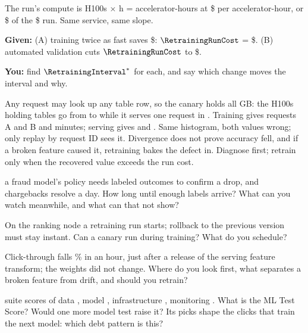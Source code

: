 \documentclass{studysheet}
\begin{document}
\begin{leftcol}
\vspace{12pt}
\begin{practicebox}
The run's compute is  H100s $\times$  h =  accelerator-hours at
\$ per accelerator-hour, or \$ of the \$ run. Same service, same slope.\par\vspace{4pt}
\textbf{Given:} (A) training twice as fast saves \$: $\RetrainingRunCost$ = \$.
(B) \assumed{} automated validation cuts $\RetrainingRunCost$ to \$.\par
\textbf{You:} find $\RetrainingInterval^*$ for each, and say which change moves the interval and why.
\end{practicebox}
\end{leftcol}%
\begin{rightcol}
%
  {Any request may look up any table row, so the canary holds all  GB: the H100s holding
   tables go from  to  while it serves one request in .}{}
%
  {Training gives requests A and B  and  minutes; serving gives
    and . Same histogram, both values wrong; only replay by request ID sees it.}{}
%
  {Divergence does not prove accuracy fell, and if a broken feature caused it, retraining bakes the defect
   in. Diagnose first; retrain only when the recovered value exceeds the run cost.}{}

\vspace{2pt}
\begin{qs}
\item \assumed{} a fraud model's policy needs  labeled outcomes to confirm a drop, and chargebacks
  resolve  a day. How long until enough labels arrive? What can you watch meanwhile, and what
  can that not show?
\item On the ranking node a retraining run starts; rollback to the previous version must stay
  instant. Can a canary run during training? What do you schedule?
\item Click-through falls \% in an hour, just after a release of the serving feature transform;
  the weights did not change. Where do you look first, what separates a broken feature from drift, and
  should you retrain?
\item \assumed{} suite scores of data , model , infrastructure ,
  monitoring . What is the ML Test Score? Would one more model test raise it? Its picks shape the clicks that train the next model: which debt pattern is this?
\end{qs}
\end{rightcol}
\end{document}
